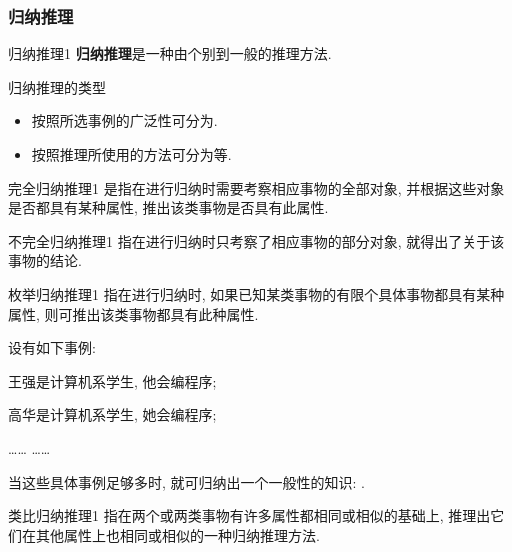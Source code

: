 \subsubsection{归纳推理}
\vspace{0.3cm}
\begin{mydef}{归纳推理}{1}
\textbf{归纳推理}是一种由个别到一般的推理方法.
\end{mydef}
\begin{example}
归纳推理的类型
\begin{itemize}
\item 按照所选事例的广泛性可分为.
\item 按照推理所使用的方法可分为等.
\end{itemize}
\end{example}
\vspace{0.3cm}
\begin{mydef}{完全归纳推理}{1}
是指在进行归纳时需要考察相应事物的全部对象, 并根据这些对象是否都具有某种属性, 推出该类事物是否具有此属性.
\end{mydef}
\vspace{0.3cm}
\begin{mydef}{不完全归纳推理}{1}
指在进行归纳时只考察了相应事物的部分对象, 就得出了关于该事物的结论.
\end{mydef}
\vspace{0.3cm}
\begin{mydef}{枚举归纳推理}{1}
指在进行归纳时, 如果已知某类事物的有限个具体事物都具有某种属性, 则可推出该类事物都具有此种属性.
\end{mydef}
\begin{example}
设有如下事例:

    王强是计算机系学生, 他会编程序;

    高华是计算机系学生, 她会编程序;

     ……                ……
\end{example}
    当这些具体事例足够多时, 就可归纳出一个一般性的知识: .
\vspace{0.3cm}
\begin{mydef}{类比归纳推理}{1}
指在两个或两类事物有许多属性都相同或相似的基础上, 推理出它们在其他属性上也相同或相似的一种归纳推理方法.
\end{mydef}
